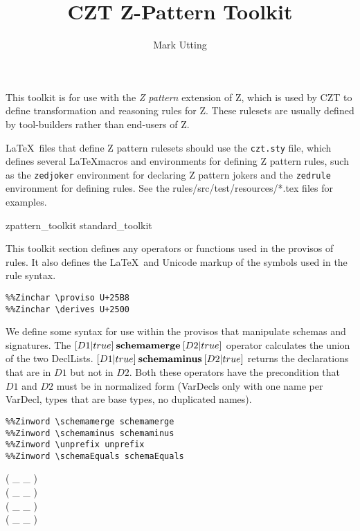 \documentclass[10pt]{article}
\title{CZT Z-Pattern Toolkit}
\author{Mark Utting}
\begin{document}
\maketitle

This toolkit is for use with the \emph{Z pattern} extension of Z,
which is used by CZT to define transformation and reasoning rules
for Z.  These rulesets are usually defined by tool-builders rather
than end-users of Z.

\LaTeX\ files that define Z pattern rulesets should use the
\verb!czt.sty! file, which defines several \LaTeX macros and
environments for defining Z pattern rules, such as 
the \verb!zedjoker! environment for declaring
Z pattern jokers and the \verb!zedrule! environment for defining
rules.  See the rules/src/test/resources/*.tex files for examples.

\begin{zsection}
  \SECTION zpattern\_toolkit \parents standard\_toolkit
\end{zsection}

This toolkit section defines any operators or functions used in the
provisos of rules.  It also defines the \LaTeX\ and Unicode markup of
the symbols used in the rule syntax.

\begin{verbatim}
%%Zinchar \proviso U+25B8
%%Zinchar \derives U+2500
\end{verbatim}

We define some syntax for use within the provisos that manipulate
schemas and signatures.  The $[D1|true] \mathbin{\textbf{schemamerge}} [D2|true]$
operator calculates the union of the two DeclLists. 
$[D1|true] \mathbin{\textbf{schemaminus}} [D2|true]$ returns the declarations that are in
$D1$ but not in $D2$.  Both these operators have the precondition that
$D1$ and $D2$ must be in normalized form (VarDecls only with one name
per VarDecl, types that are base types, no duplicated names).

\begin{verbatim}
%%Zinword \schemamerge schemamerge
%%Zinword \schemaminus schemaminus
%%Zinword \unprefix unprefix
%%Zinword \schemaEquals schemaEquals
\end{verbatim}

\begin{zed}
   \leftassoc ( \_ \schemamerge \_ ) \\
   \leftassoc ( \_ \schemaminus \_ ) \\
   \leftassoc ( \_ \unprefix \_ ) \\
  \relation ( \_ \schemaEquals \_ )
\end{zed}
\end{document}
